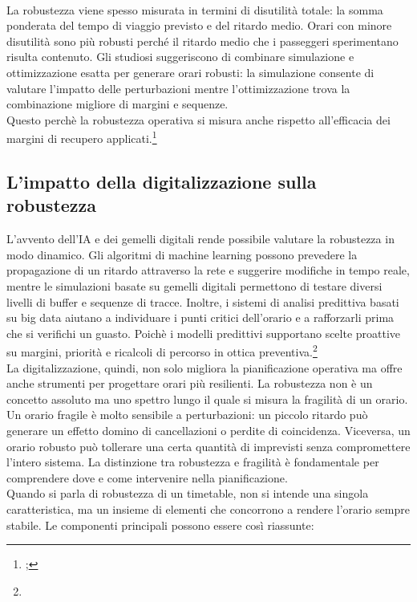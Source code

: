 \documentclass{report}
\newcommand{\fnShort}[2][]{\footnote{\footshorthand[#1]{#2}}}
\begin{document}
\\ La robustezza viene spesso misurata in termini di disutilità totale: la somma ponderata del tempo di viaggio previsto e del ritardo medio. Orari con minore disutilità sono più robusti perché il ritardo medio che i passeggeri sperimentano risulta contenuto.
Gli studiosi suggeriscono di combinare simulazione e ottimizzazione esatta per generare orari robusti: la simulazione consente di valutare l’impatto delle perturbazioni mentre l’ottimizzazione trova la combinazione migliore di margini e sequenze.
\\ Questo perchè la robustezza operativa si misura anche rispetto all’efficacia dei margini di recupero applicati.\footnote{; }





\subsection{L’impatto della digitalizzazione sulla robustezza}
L’avvento dell’IA e dei gemelli digitali rende possibile valutare la robustezza in modo dinamico. Gli algoritmi di machine learning possono prevedere la propagazione di un ritardo attraverso la rete e suggerire modifiche in tempo reale, mentre le simulazioni basate su gemelli digitali permettono di testare diversi livelli di buffer e sequenze di tracce. 
Inoltre, i sistemi di analisi predittiva basati su big data aiutano a individuare i punti critici dell’orario e a rafforzarli prima che si verifichi un guasto. Poichè i modelli predittivi supportano scelte proattive su margini, priorità e ricalcoli di percorso in ottica preventiva.\fnShort{TRC2023} \\ La digitalizzazione, quindi, non solo migliora la pianificazione operativa ma offre anche strumenti per progettare orari più resilienti.
La robustezza non è un concetto assoluto ma uno spettro lungo il quale si misura la fragilità di un orario. Un orario fragile è molto sensibile a perturbazioni: un piccolo ritardo può generare un effetto domino di cancellazioni o perdite di coincidenza. Viceversa, un orario robusto può tollerare una certa quantità di imprevisti senza compromettere l’intero sistema. La distinzione tra robustezza e fragilità è fondamentale per comprendere dove e come intervenire nella pianificazione.\\
Quando si parla di robustezza di un timetable, non si intende una singola caratteristica, ma un insieme di elementi che concorrono a rendere l’orario sempre stabile. Le componenti principali possono essere così riassunte:
\end{document}
